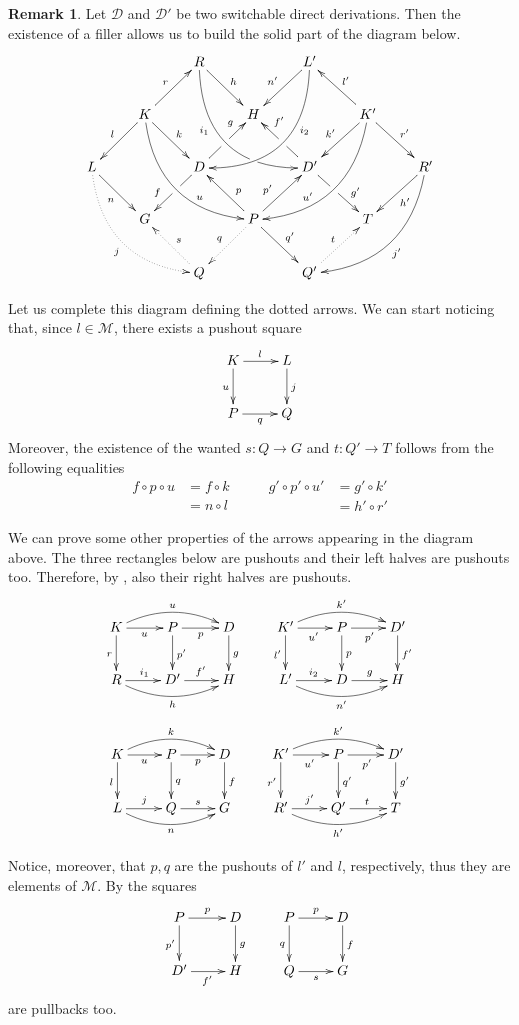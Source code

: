 \documentclass[a4paper]{article}
\newcommand{\dder}[1]{\mathscr{#1}}
\theoremstyle{definition}
\newtheorem{remark}[theorem]{Remark}
\begin{document}
\begin{remark}\label{rem:deco} Let $\dder{D}$ and $\dder{D'}$ be two switchable direct derivations. Then the existence of a filler allows us to build the solid part of the diagram below.
	\[\xymatrix{&&R \ar@/_1cm/[ddrr]_(.35){i_1}|(.7)\hole  \ar[dr]^{h}&& L'\ar@/^1cm/[ddll]^(.35){i_2}  \ar[dl]_{n'}\\&K\ar[dr]^{k}\ar[dl]_{l} \ar@/_.8cm/[ddrr]^(.65){u}\ar[ur]^{r}&& H && K' \ar@/^.8cm/[ddll]_(.65){u'}\ar[dl]_{k'}\ar[lu]_{l'} \ar[dr]^{r'}\\L \ar[dr]_{n} \ar@{.>}@/_.8cm/[ddrr]_{j}&& D \ar[dl]|(.42)\hole_(.64){f}\ar[ur]|(.48)\hole^(.7){g}&&D' \ar[dr]|(.42)\hole^(.65){g'} \ar[ul]|(.48)\hole_(.7){f'}&&R'\ar@/^.8cm/[ddll]^{j'}\ar[dl]^{h'}\\&G &&P\ar[dr]^{q'} \ar@{.>}[dl]_{q}\ar[ur]^(.4){p'}\ar[ul]_(.4){p}&&T\\&&Q \ar@{.>}[ul]_{s} &&Q'\ar@{.>}[ur]^{t}}\]
	
	Let us complete this diagram defining the dotted arrows. We can start noticing that, since $l\in \mathcal{M}$, there exists a pushout square 
	\[\xymatrix{K \ar[r]^{l} \ar[d]_{u}& L\ar[d]^{j} \\ P \ar[r]_{q} & Q}\]
	Moreover, the existence of the wanted $s\colon Q\to G$ and $t\colon Q'\to T$ follows from the following equalities
	\[\begin{split}
		f\circ p \circ u &= f\circ k \\&= n\circ l
	\end{split} \qquad \begin{split}
		g'\circ p'\circ u' &= g'\circ k'\\&=h'\circ r'
	\end{split}\]
	
	We can prove some other properties of the arrows appearing in the diagram above. The three rectangles below are pushouts and their left halves are pushouts too. Therefore, by , also their right halves are pushouts.
	\[\xymatrix{K \ar@/^.4cm/[rr]^{u}\ar[d]_{r}\ar[r]_{u} &P\ar[d]^{p'} \ar[r]_{p} & D \ar[d]^{g}&K' \ar@/^.4cm/[rr]^{k'}\ar[d]_{l'}\ar[r]_{u'} &P\ar[d]^{p} \ar[r]_{p'} & D' \ar[d]^{f'}\\  R \ar@/_.4cm/[rr]_{h} \ar[r]^{i_1}&D' \ar[r]^{f'} & H&L' \ar@/_.4cm/[rr]_{n'} \ar[r]^{i_2}&D \ar[r]^{g} & H}\]
	\[ \xymatrix{K \ar@/^.4cm/[rr]^{k}\ar[d]_{l}\ar[r]_{u} &P\ar[d]^{q} \ar[r]_{p} & D \ar[d]^{f}&K' \ar@/^.4cm/[rr]^{k'}\ar[d]_{r'}\ar[r]_{u'} &P\ar[d]^{q'} \ar[r]_{p'} & D' \ar[d]^{g'}\\ L \ar@/_.4cm/[rr]_{n} \ar[r]^{j}&Q \ar[r]^{s} & G&R' \ar@/_.4cm/[rr]_{h'} \ar[r]^{j'}&Q' \ar[r]^{t} & T}\]
	
	Notice, moreover, that $p, q$ are the pushouts of $l'$ and $l$, respectively, thus they  are elements of $\mathcal{M}$. By  the squares
	\[\xymatrix{P\ar[r]^{p} \ar[d]_{p'} & D \ar[d]^{g}& P \ar[r]^{p} \ar[d]_{q} &D\ar[d]^{f}\\ D' \ar[r]_{f'} & H & Q \ar[r]_{s}& G}\]
	are pullbacks too.
\end{remark}
\end{document}
